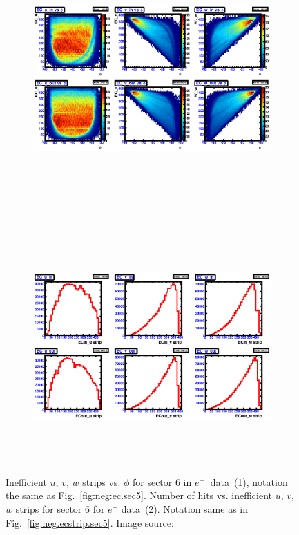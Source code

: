 \begin{figure}[htpb]
  \centering
  \begin{subfigure}[b]{\figwidth}
  \includegraphics[width=\figwidth, height=3.5in,valign=c]{figures/calib/ec/pim_ecuvw_phi_NOKnockout_sec6.eps}\caption{}\label{fig:EC_I_VI}
  \end{subfigure}%
  \\
  \begin{subfigure}[b]{\figwidth}
  \includegraphics[width=\figwidth, height=3.5in,valign=c]{figures/calib/ec/pim_ecuvw_NOKnockout_sec6.eps}\caption{}\label{fig:EC_II_VI}
  \end{subfigure}%
      \caption {Inefficient  $u$, $v$, $w$ strips vs. $\phi$ for sector 6 in  $e^{-} \ $ data~(\ref{fig:EC_I_VI}), notation the same as Fig.~\ref{fig:neg:ec.sec5}. Number of hits vs. inefficient  $u$, $v$, $w$ strips for sector 6 for $e^-$ data~(\ref{fig:EC_II_VI}). Notation same as in Fig.~\ref{fig:neg.ecstrip.sec5}. Image source:~\cite{clas.thesis.kunkel}}
        \label{fig:EC_no_VI}
\end{figure}



